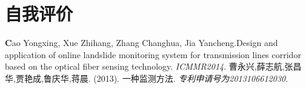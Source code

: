 \documentclass[11pt,a4paper]{moderncv}
\begin{document}
\section{自我评价}


\begin{thebibliography}{99}
\textbf Cao Yongxing, Xue Zhihang, Zhang Changhua, Jia Yancheng.Design and application of online landslide monitoring system for transmission lines corridor based on the optical fiber sensing technology. \textit{ICMMR2014}.
\textbf{}曹永兴,薛志航,张昌华,贾艳成,鲁庆华,蒋晨. (2013). 一种监测方法. \textit{专利申请号为2013106612030}.
\end{thebibliography}
\end{document}
